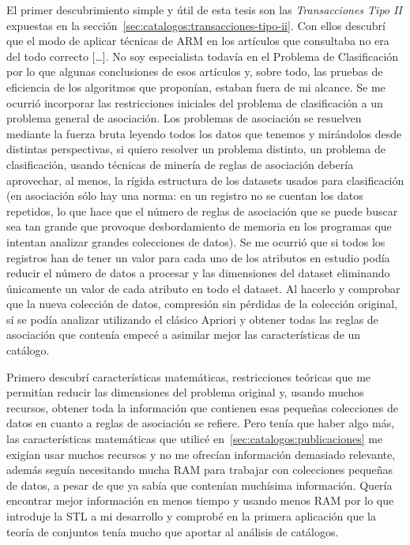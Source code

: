 El primer descubrimiento simple y útil de esta tesis son las \emph{Transacciones Tipo II} expuestas en la sección~\ref{sec:catalogos:transacciones-tipo-ii}. Con ellos descubrí que el modo de aplicar técnicas de ARM en los artículos que consultaba no era del todo correcto  [\ldots]. No soy especialista todavía en el Problema de Clasificación por lo que algunas conclusiones de esos artículos y, sobre todo, las pruebas de eficiencia de los algoritmos que proponían, estaban fuera de mi alcance. Se me ocurrió incorporar las restricciones iniciales del problema de clasificación a un problema general de asociación. Los problemas de asociación se resuelven mediante la fuerza bruta leyendo todos los datos que tenemos y mirándolos desde distintas perspectivas, si quiero resolver un problema distinto, un problema de clasificación, usando técnicas de minería de reglas de asociación debería aprovechar, al menos, la rígida estructura de los datasets usados para clasificación (en asociación sólo hay una norma: en un registro no se cuentan los datos repetidos, lo que hace que el número de reglas de asociación que se puede buscar sea tan grande que provoque desbordamiento de memoria en los programas que intentan analizar grandes colecciones de datos). Se me ocurrió que si todos los registros han de tener un valor para cada uno de los atributos en estudio podía reducir el número de datos a procesar y las dimensiones del dataset eliminando únicamente un valor de cada atributo en todo el dataset. Al hacerlo y comprobar que la nueva colección de datos, compresión sin pérdidas de la colección original, sí se podía analizar utilizando el clásico Apriori y obtener todas las reglas de asociación que contenía empecé a asimilar mejor las características de un catálogo.

Primero descubrí características matemáticas, restricciones teóricas que me permitían reducir las dimensiones del problema original y, usando muchos recursos, obtener toda la información que contienen esas pequeñas colecciones de datos en cuanto a reglas de asociación se refiere. Pero tenía que haber algo más, las características matemáticas que utilicé en~\ref{sec:catalogos:publicaciones} me exigían usar muchos recursos y no me ofrecían información demasiado relevante, además seguía necesitando mucha RAM para trabajar con colecciones pequeñas de datos, a pesar de que ya sabía que contenían muchísima información. Quería encontrar mejor información en menos tiempo y usando menos RAM por lo que introduje la STL a mi desarrollo y comprobé en la primera aplicación que la teoría de conjuntos tenía mucho que aportar al análisis de catálogos.
